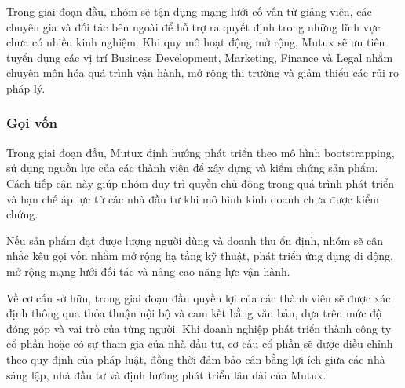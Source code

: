 Trong giai đoạn đầu, nhóm sẽ tận dụng mạng lưới cố vấn từ giảng viên, các chuyên gia và đối tác bên ngoài để hỗ trợ ra quyết định trong những lĩnh vực chưa có nhiều kinh nghiệm. Khi quy mô hoạt động mở rộng, Mutux sẽ ưu tiên tuyển dụng các vị trí Business Development, Marketing, Finance và Legal nhằm chuyên môn hóa quá trình vận hành, mở rộng thị trường và giảm thiểu các rủi ro pháp lý.

\subsubsection{Gọi vốn}
Trong giai đoạn đầu, Mutux định hướng phát triển theo mô hình bootstrapping, sử dụng nguồn lực của các thành viên để xây dựng và kiểm chứng sản phẩm. Cách tiếp cận này giúp nhóm duy trì quyền chủ động trong quá trình phát triển và hạn chế áp lực từ các nhà đầu tư khi mô hình kinh doanh chưa được kiểm chứng.

Nếu sản phẩm đạt được lượng người dùng và doanh thu ổn định, nhóm sẽ cân nhắc kêu gọi vốn nhằm mở rộng hạ tầng kỹ thuật, phát triển ứng dụng di động, mở rộng mạng lưới đối tác và nâng cao năng lực vận hành.

Về cơ cấu sở hữu, trong giai đoạn đầu quyền lợi của các thành viên sẽ được xác định thông qua thỏa thuận nội bộ và cam kết bằng văn bản, dựa trên mức độ đóng góp và vai trò của từng người. Khi doanh nghiệp phát triển thành công ty cổ phần hoặc có sự tham gia của nhà đầu tư, cơ cấu cổ phần sẽ được điều chỉnh theo quy định của pháp luật, đồng thời đảm bảo cân bằng lợi ích giữa các nhà sáng lập, nhà đầu tư và định hướng phát triển lâu dài của Mutux.

